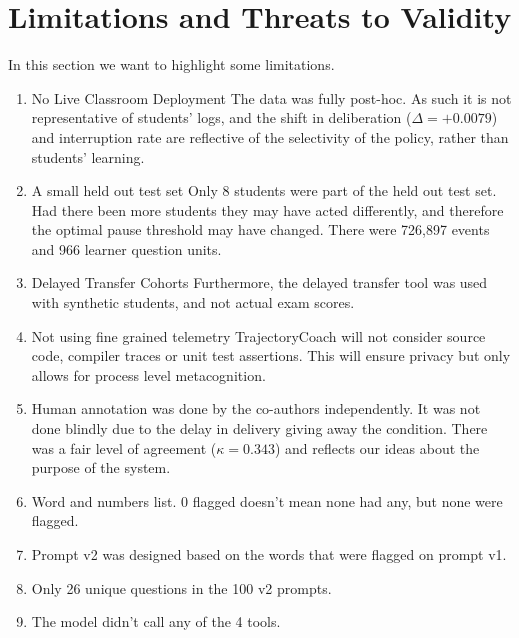 \documentclass[conference]{IEEEtran}
\begin{document}
\section{Limitations and Threats to Validity}

In this section we want to highlight some limitations.

\begin{enumerate}
\item[1.] No Live Classroom Deployment The data was fully post-hoc. As such it is not representative of students' logs, and the shift in deliberation ($\Delta = +0.0079$) and interruption rate are reflective of the selectivity of the policy, rather than students' learning.

\item[2.] A small held out test set Only 8 students were part of the held out test set. Had there been more students they may have acted differently, and therefore the optimal pause threshold may have changed. There were 726,897 events and 966 learner question units.

\item[3.] Delayed Transfer Cohorts Furthermore, the delayed transfer tool was used with synthetic students, and not actual exam scores.

\item[4.] Not using fine grained telemetry TrajectoryCoach will not consider source code, compiler traces or unit test assertions. This will ensure privacy but only allows for process level metacognition.

\item[5.] Human annotation was done by the co-authors independently. It was not done blindly due to the delay in delivery giving away the condition. There was a fair level of agreement ($\kappa = 0.343$) and reflects our ideas about the purpose of the system.

\item[6.] Word and numbers list. 0 flagged doesn't mean none had any, but none were flagged.

\item[7.] Prompt v2 was designed based on the words that were flagged on prompt v1.

\item[8.] Only 26 unique questions in the 100 v2 prompts.

\item[9.] The model didn't call any of the 4 tools.


\end{enumerate}
\end{document}
